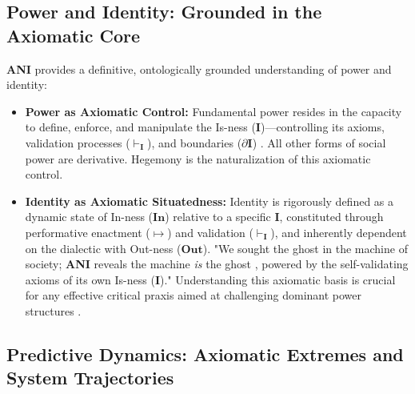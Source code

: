 \documentclass{article}
\newcommand{\ANI}{\textbf{ANI}}             %
\newcommand{\Isness}{\mathbf{I}}            %
\newcommand{\Inness}{\mathbf{In}}           %
\newcommand{\Outness}{\mathbf{Out}}         %
\newcommand{\enactment}{\ensuremath{\mapsto}} %
\newcommand{\validates}[1]{\ensuremath{\vdash_{#1}}} %
\newcommand{\boundary}[1]{\ensuremath{\partial #1}} %
\begin{document}
\subsection{Power and Identity: Grounded in the Axiomatic Core}

\ANI{} provides a definitive, ontologically grounded understanding of power and identity:
\begin{itemize}
    \item \textbf{Power as Axiomatic Control:} Fundamental power resides in the capacity to define, enforce, and manipulate the Is-ness ($\Isness$)—controlling its axioms, validation processes ($\validates{\Isness}$), and boundaries ($\boundary{\Isness}$) \citep{Foucault1972}. All other forms of social power are derivative. Hegemony is the naturalization of this axiomatic control.
    \item \textbf{Identity as Axiomatic Situatedness:} Identity is rigorously defined as a dynamic state of In-ness ($\Inness$) relative to a specific $\Isness$, constituted through performative enactment ($\enactment$) \citep{Goffman1959} and validation ($\validates{\Isness}$), and inherently dependent on the dialectic with Out-ness ($\Outness$). "We sought the ghost in the machine of society; \ANI{} reveals the machine \textit{is} the ghost \citep{Bateson1972}, powered by the self-validating axioms of its own Is-ness ($\Isness$)." Understanding this axiomatic basis is crucial for any effective critical praxis aimed at challenging dominant power structures \citep{Bourdieu1990}.
\end{itemize}

\subsection{Predictive Dynamics: Axiomatic Extremes and System Trajectories}
\end{document}
